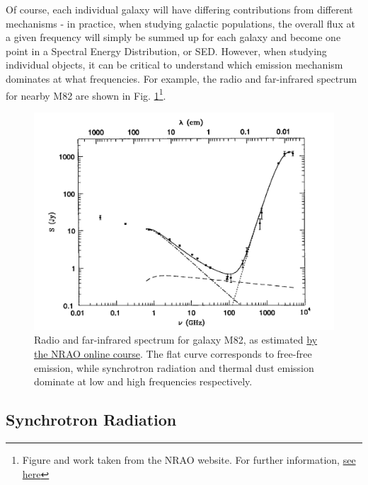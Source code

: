 \pg
Of course, each individual galaxy will have differing contributions from different mechanisms - in practice, when studying galactic populations, the overall flux at a given frequency will simply be summed up for each galaxy and become one point in a Spectral Energy Distribution, or SED. However, when studying individual objects, it can be critical to understand which emission mechanism dominates at what frequencies. %
For example, the radio and far-infrared spectrum for nearby M82 are shown in Fig. \ref{plot.m82.spectrum}\footnote{Figure and work taken from the NRAO website. For further information, \href{https://www.cv.nrao.edu/course/astr534/FreeFreeEmission.html}{see here}}.
\begin{figure}[!h]
\centering
\includegraphics[width=\textwidth]{images/M82Spectrum.png}
\caption{\label{plot.m82.spectrum} Radio and far-infrared spectrum for galaxy M82, as estimated \href{https://www.cv.nrao.edu/course/astr534/FreeFreeEmission.html}{by the NRAO online course}. The flat curve corresponds to free-free emission, while synchrotron radiation and thermal dust emission dominate at low and high frequencies respectively.}
\end{figure}


\subsection{Synchrotron Radiation}

